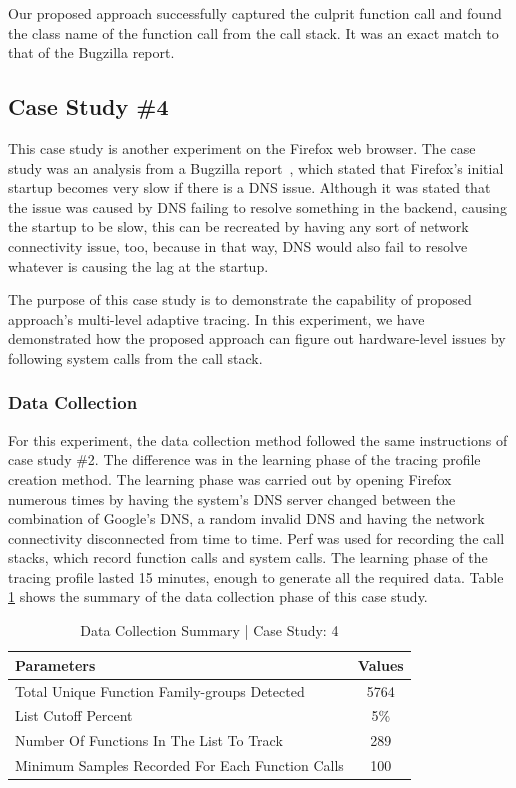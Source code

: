 \documentclass[pdflatex,sn-nature]{sn-jnl}%
\theoremstyle{thmstyleone}%
\theoremstyle{thmstyletwo}%
\theoremstyle{thmstylethree}%
\begin{document}
Our proposed approach successfully captured the culprit function call and found the class name of the function call from the call stack. It was an exact match to that of the Bugzilla report.


\subsection{Case Study \#4}

This case study is another experiment on the Firefox web browser. The case study was an analysis from a Bugzilla report~\cite{cook-2022}, which stated that Firefox's initial startup becomes very slow if there is a DNS issue. Although it was stated that the issue was caused by DNS failing to resolve something in the backend, causing the startup to be slow, this can be recreated by having any sort of network connectivity issue, too, because in that way, DNS would also fail to resolve whatever is causing the lag at the startup.

The purpose of this case study is to demonstrate the capability of proposed approach's multi-level adaptive tracing. In this experiment, we have demonstrated how the proposed approach can figure out hardware-level issues by following system calls from the call stack.


\subsubsection{Data Collection}
For this experiment, the data collection method followed the same instructions of case study \#2. The difference was in the learning phase of the tracing profile creation method. The learning phase was carried out by opening Firefox numerous times by having the system's DNS server changed between the combination of Google's DNS, a random invalid DNS and having the network connectivity disconnected from time to time. Perf was used for recording the call stacks, which record function calls and system calls. The learning phase of the tracing profile lasted 15 minutes, enough to generate all the required data. Table \ref{tabledatacollectioncs4} shows the summary of the data collection phase of this case study.

\begin{table}[tbp]

\centering
\begin{tabular}{ |l|c| }
\hline
\textbf{Parameters} & \textbf{Values} \\
\hline
Total Unique Function Family-groups Detected & 5764 \\
\hline
List Cutoff Percent & 5\% \\
\hline
Number Of Functions In The List To Track & 289 \\
\hline
Minimum Samples Recorded For Each Function Calls & 100 \\
\hline
\end{tabular}%
\caption{Data Collection Summary | Case Study: 4}
\label{tabledatacollectioncs4}
\end{table}
\end{document}
